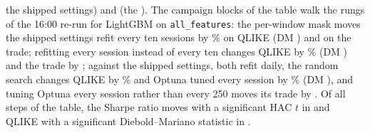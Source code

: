 the shipped settings) and \cmLdEstMax{} (the \cmLdEstMaxWho). The campaign blocks of the table walk
the rungs of the 16:00 re-run for LightGBM on \texttt{all\_features}: the per-window mask moves
the shipped settings refit every ten sessions by \cmLdCMaskTtenQ\% on QLIKE (DM
\cmLdCMaskTtenDM) and \cmLdCMaskTten{} on the trade; refitting every session instead of every
ten changes QLIKE by \cmLdCCadLgbmQ\% (DM \cmLdCCadLgbmDM) and the trade by \cmLdCCadLgbm;
against the shipped settings, both refit daily, the random search changes QLIKE by
\cmLdCTuneRsQ\% and Optuna tuned every session by \cmLdCTuneOpQ\% (DM \cmLdCTuneOpDM), and
tuning Optuna every session rather than every 250 moves its trade by \cmLdCTuneOpPer. Of all
\cmLdN{} steps of the table, the Sharpe ratio moves with a significant HAC $t$ %
in \cmLdResolved{} and QLIKE with a significant Diebold--Mariano statistic in
\cmLdQResolved.

